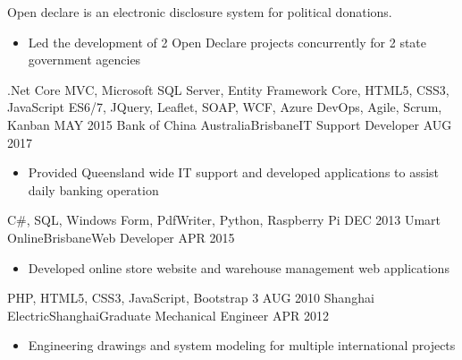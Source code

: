 \begin{experiences}
{                    Open declare is an electronic disclosure system for political donations.
                      \begin{itemize}
                        \item Led the development of 2 Open Declare projects concurrently for 2 state government agencies
                      \end{itemize}
                    }
                    {.Net Core MVC, Microsoft SQL Server, Entity Framework Core, HTML5, CSS3, JavaScript ES6/7, JQuery, Leaflet, SOAP, WCF, Azure DevOps, Agile, Scrum, Kanban}
  \emptySeparator
    \experience
    {MAY 2015}   {Bank of China Australia}{Brisbane}{IT Support Developer 
    }
    {AUG 2017} {
                      \begin{itemize}
                        \item Provided Queensland wide IT support and developed applications to assist daily banking operation
                      \end{itemize}
                    }
                    {C\#, SQL, Windows Form, PdfWriter, Python, Raspberry Pi}
  \emptySeparator
  \experience
    {DEC 2013}   {Umart Online}{Brisbane}{Web Developer}
    {APR 2015} {
                      \begin{itemize}
                        \item Developed online store website and warehouse management web applications
                      \end{itemize}
                    }
                    {PHP, HTML5, CSS3, JavaScript, Bootstrap 3}
  \emptySeparator
  \experience
    {AUG 2010}   {Shanghai Electric}{Shanghai}{Graduate Mechanical Engineer}
    {APR 2012} {
                      \begin{itemize}
                        \item Engineering drawings and system modeling for multiple international projects

\end{itemize}}
\end{experiences}
